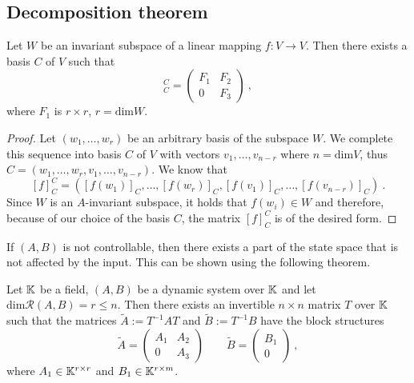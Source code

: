\subsection{Decomposition theorem}

\begin{lemma}
	\label{lem:invsubspc}
	Let $W$ be an invariant subspace of a linear mapping $f\colon V \rightarrow V$. Then there exists a basis $C$ of $V$ such that 
	\begin{equation*}
		[f]^C_C=
		\begin{pmatrix}
			F_1 & F_2 \\
			0   & F_3 
		\end{pmatrix}\ ,
	\end{equation*}
	where $F_1$ is $r\times r$, $r=\text{dim}W$.
\end{lemma}

\begin{proof}
	Let $(w_1,\ldots,w_r)$ be an arbitrary basis of the subspace $W$. We complete this sequence into basis $C$ of $V$ with vectors $v_1,\ldots,v_{n-r}$ where $n=\text{dim}V$, thus $C=(w_1,\ldots,w_r,v_1,\ldots,v_{n-r})$. We know that
	$$[f]^C_C=([f(w_1)]_C,\ldots,[f(w_r)]_C,[f(v_1)]_C,\ldots,[f(v_{n-r})]_C)\ .$$
	Since $W$ is an $A$-invariant subspace, it holds that $f(w_i)\in W$ and therefore, because of our choice of the basis $C$, the matrix $[f]^C_C$ is of the desired form.
\end{proof}

If $(A,B)$ is not controllable, then there exists a part of the state space that is not affected by the input. This can be shown using the following theorem.

\begin{theorem}
	\label{theorem:decomp}
	Let $\mathbb{K}$ be a field, $(A,B)$ be a dynamic system over $\mathbb{K}$ and let $\text{dim}\mathcal{R}(A,B)=r\leq n$. Then there exists an invertible $n\times n$ matrix $T$ over $\mathbb{K}$ such that the matrices $\widetilde{A}:=T^{-1}AT$ and $\widetilde{B}:=T^{-1}B$ have the block structures 
	\begin{equation}
		\label{eq:decomp}
		\widetilde{A}=
		\begin{pmatrix}
			A_1 & A_2 \\
			0   & A_3 
		\end{pmatrix}
		\qquad
		\widetilde{B}=
		\begin{pmatrix}
			B_1  \\
			0
		\end{pmatrix}\ ,
	\end{equation}
	where $A_1\in\mathbb{K}^{r \times r}$ and $B_1\in\mathbb{K}^{r \times m}$.
\end{theorem}

